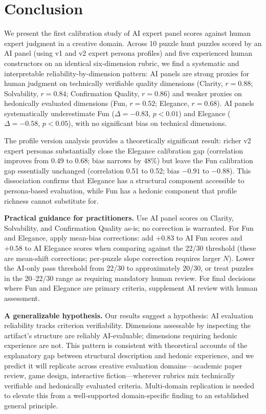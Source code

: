 \section{Conclusion}
\label{sec:conclusion}

We present the first calibration study of AI expert panel scores against human expert judgment in a creative domain. Across 10 puzzle hunt puzzles scored by an AI panel (using v1 and v2 expert persona profiles) and five experienced human constructors on an identical six-dimension rubric, we find a systematic and interpretable reliability-by-dimension pattern: AI panels are strong proxies for human judgment on technically verifiable quality dimensions (Clarity, $r = 0.88$; Solvability, $r = 0.84$; Confirmation Quality, $r = 0.86$) and weaker proxies on hedonically evaluated dimensions (Fun, $r = 0.52$; Elegance, $r = 0.68$). AI panels systematically underestimate Fun ($\Delta = -0.83$, $p < 0.01$) and Elegance ($\Delta = -0.58$, $p < 0.05$), with no significant bias on technical dimensions.

The profile version analysis provides a theoretically significant result: richer v2 expert personas substantially close the Elegance calibration gap (correlation improves from 0.49 to 0.68; bias narrows by 48\%) but leave the Fun calibration gap essentially unchanged (correlation 0.51 to 0.52; bias $-0.91$ to $-0.88$). This dissociation confirms that Elegance has a structural component accessible to persona-based evaluation, while Fun has a hedonic component that profile richness cannot substitute for.

\textbf{Practical guidance for practitioners.} Use AI panel scores on Clarity, Solvability, and Confirmation Quality as-is; no correction is warranted. For Fun and Elegance, apply mean-bias corrections: add $+0.83$ to AI Fun scores and $+0.58$ to AI Elegance scores when comparing against the 22/30 threshold (these are mean-shift corrections; per-puzzle slope correction requires larger $N$). Lower the AI-only pass threshold from 22/30 to approximately 20/30, or treat puzzles in the 20--22/30 range as requiring mandatory human review. For final decisions where Fun and Elegance are primary criteria, supplement AI review with human assessment.

\textbf{A generalizable hypothesis.} Our results suggest a hypothesis: AI evaluation reliability tracks criterion verifiability. Dimensions assessable by inspecting the artifact's structure are reliably AI-evaluable; dimensions requiring hedonic experience are not. This pattern is consistent with theoretical accounts of the explanatory gap between structural description and hedonic experience, and we predict it will replicate across creative evaluation domains---academic paper review, game design, interactive fiction---wherever rubrics mix technically verifiable and hedonically evaluated criteria. Multi-domain replication is needed to elevate this from a well-supported domain-specific finding to an established general principle.

